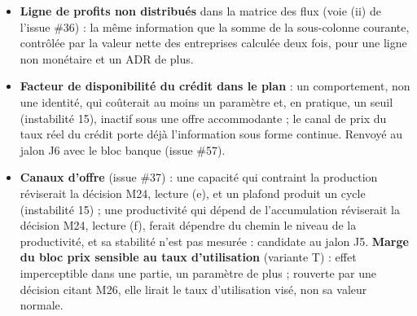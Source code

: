 \documentclass[11pt,a4paper]{article}
\begin{document}
\begin{itemize}
\item \textbf{Ligne de profits non distribués} dans la matrice des flux (voie (ii) de l'issue \#36) : la même information que la somme de la sous-colonne courante, contrôlée par la valeur nette des entreprises calculée deux fois, pour une ligne non monétaire et un ADR de plus.
\item \textbf{Facteur de disponibilité du crédit dans le plan} : un comportement, non une identité, qui coûterait au moins un paramètre et, en pratique, un seuil (instabilité 15), inactif sous une offre accommodante ; le canal de prix du taux réel du crédit porte déjà l'information sous forme continue. Renvoyé au jalon J6 avec le bloc banque (issue \#57).
\item \textbf{Canaux d'offre} (issue \#37) : une capacité qui contraint la production réviserait la décision M24, lecture (e), et un plafond produit un cycle (instabilité 15) ; une productivité qui dépend de l'accumulation réviserait la décision M24, lecture (f), ferait dépendre du chemin le niveau de la productivité, et sa stabilité n'est pas mesurée : candidate au jalon J5. \textbf{Marge du bloc prix sensible au taux d'utilisation} (variante T) : effet imperceptible dans une partie, un paramètre de plus ; rouverte par une décision citant M26, elle lirait le taux d'utilisation visé, non sa valeur normale.
\end{itemize}
\end{document}
